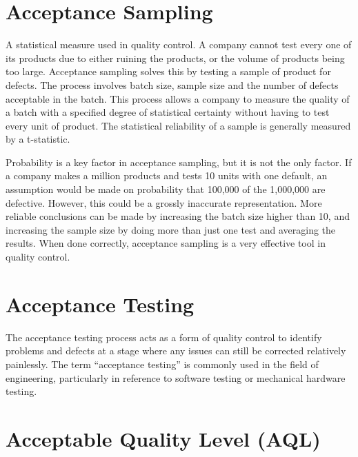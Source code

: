 \documentclass[12pts]{article}
\begin{document}
\tableofcontents



\section{Acceptance Sampling}

A statistical measure used in quality control. A company cannot test every one of its products due to either ruining the products, or the volume of products being too large. Acceptance sampling solves this by testing a sample of product for defects. The process involves batch size, sample size and the number of defects acceptable in the batch. This process allows a company to measure the quality of a batch with a specified degree of statistical certainty without having to test every unit of product. The statistical reliability of a sample is generally measured by a t-statistic.

Probability is a key factor in acceptance sampling, but it is not the only factor. If a company makes a million products and tests 10 units with one default, an assumption would be made on probability that 100,000 of the 1,000,000 are defective. However, this could be a grossly inaccurate representation. More reliable conclusions can be made by increasing the batch size higher than 10, and increasing the sample size by doing more than just one test and averaging the results. When done correctly, acceptance sampling is a very effective tool in quality control.

\section{Acceptance Testing}

The acceptance testing process acts as a form of quality control to identify problems and defects at a stage where any issues can still be corrected relatively painlessly. The term “acceptance testing” is commonly used in the field of engineering, particularly in reference to software testing or mechanical hardware testing.

\section{Acceptable Quality Level (AQL)}
\end{document}
